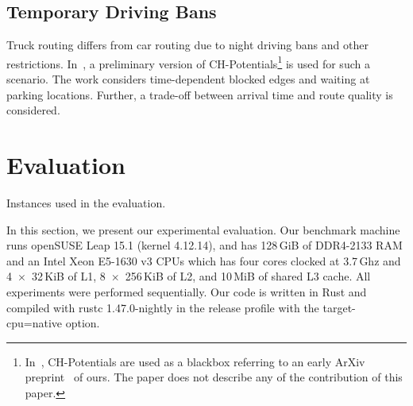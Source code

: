 \documentclass[a4paper,USenglish,cleveref, autoref, thm-restate]{lipics-v2019}
\begin{document}
\subsection{Temporary Driving Bans}

Truck routing differs from car routing due to night driving bans and other restrictions.
In~\cite{kswz-erptd-p-20}, a preliminary version of CH-Potentials\footnote{
In~\cite{kswz-erptd-p-20}, CH-Potentials are used as a blackbox referring to an early ArXiv preprint~\cite{strasser2019perfect} of ours.
The paper does not describe any of the contribution of this paper.
} is used for such a scenario.
The work considers time-dependent blocked edges and waiting at parking locations.
Further, a trade-off between arrival time and route quality is considered.

\section{Evaluation}

\label{sec:experiments}

\begin{table}
\centering
\caption{Instances used in the evaluation.}\label{tab:graphs}

\end{table}

In this section, we present our experimental evaluation.
Our benchmark machine runs openSUSE Leap 15.1 (kernel 4.12.14), and has 128\,GiB of DDR4-2133 RAM and an Intel Xeon E5-1630 v3 CPUs which has four cores clocked at 3.7\,Ghz and 4~$\times$~32\,KiB of L1, 8~$\times$~256\,KiB of L2, and 10\,MiB of shared L3 cache.
All experiments were performed sequentially.
Our code is written in Rust and compiled with rustc 1.47.0-nightly in the release profile with the target-cpu=native option.
\end{document}
